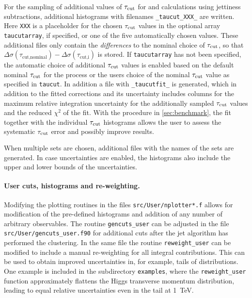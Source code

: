 For the sampling of additional values of $\tau_\text{cut}$ for \NLO{} and \NNLO{} calculations using jettiness subtractions, 
additional histograms with filenames \texttt{\_taucut\_XXX\_} are written. Here \texttt{XXX} is a placeholder for the 
chosen $\tau_\text{cut}$ values in the optional array \texttt{taucutarray}, if specified, or one of the five automatically 
chosen values. These additional files 
only contain the \emph{differences} to the nominal choice of 
$\tau_\text{cut}$, so that $\Delta\sigma(\tau_\text{cut,nominal}) - \Delta\sigma(\tau_\text{cut,i})$ is stored. If 
\texttt{taucutarray} has not 
been specified, the automatic choice of additional
$\tau_\text{cut}$ values is enabled based on the default nominal $\tau_\text{cut}$ for the process or the users choice of the nominal 
$\tau_\text{cut}$ value as specified in \texttt{taucut}.
In addition a file with \texttt{\_taucutfit\_} is generated, which in addition to the fitted corrections and its 
uncertainty includes columns for the maximum relative integration uncertainty for the additionally sampled $\tau_\text{cut}$ 
values and the 
reduced $\chi^2$ of the fit. With the procedure in \cref{sec:benchmark}, the fit together with the individual $\tau_\text{cut}$ 
histograms allows the user to assess the systematic $\tau_\text{cut}$ error and possibly improve results.

When multiple \PDF{} sets are chosen, additional files with the names of the \PDF{} sets are generated. In case
\PDF{} uncertainties are enabled, the histograms also include the upper and lower bounds of the \PDF{} uncertainties.

\paragraph{User cuts, histograms and re-weighting.}

Modifying the plotting routines in the files \texttt{src/User/nplotter*.f} allows for modification of the pre-defined 
histograms and addition of any number of arbitrary observables. The routine \texttt{gencuts\_user} can be adjusted  in 
the file
\texttt{src/User/gencuts\_user.f90} for additional cuts after the jet algorithm has performed the 
clustering. In the same file the routine \texttt{reweight\_user} can be modified to include a manual re-weighting
for all integral contributions. This can be used to obtain improved uncertainties in, for example, tails of 
distributions.
One example is included in the subdirectory \texttt{examples}, where the \texttt{reweight\_user} function approximately
flattens the Higgs transverse momentum distribution, leading to equal relative uncertainties even in the tail at 
\SI{1}{TeV}.


